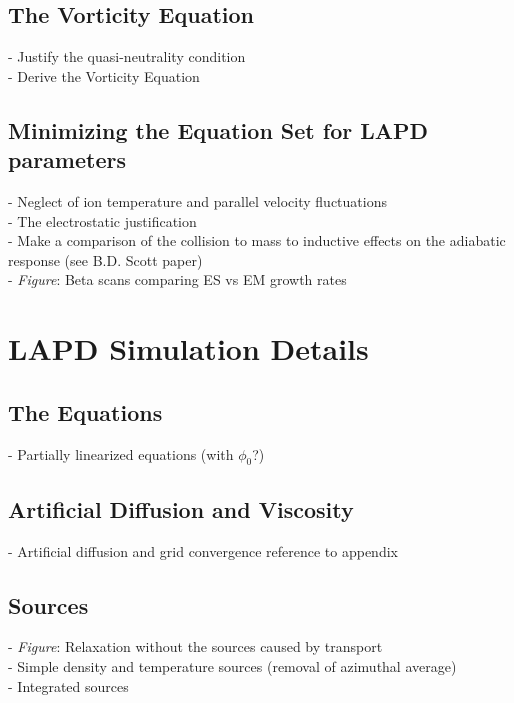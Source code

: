 \documentclass[12pt]{article}
\begin{document}
\subsection{The Vorticity Equation}

- Justify the quasi-neutrality condition \\
- Derive the Vorticity Equation \\

\subsection{Minimizing the Equation Set for LAPD parameters}

- Neglect of ion temperature and parallel velocity fluctuations \\
- The electrostatic justification \\
- Make a comparison of the collision to mass to inductive effects on the adiabatic response (see B.D. Scott paper) \\
- \emph{Figure}: Beta scans comparing ES vs EM growth rates \\


\section{LAPD Simulation Details}

\subsection{The Equations}

- Partially linearized equations (with $\phi_0$?) \\

\subsection{Artificial Diffusion and Viscosity}

- Artificial diffusion and grid convergence reference to appendix \\

\subsection{Sources}

- \emph{Figure}: Relaxation without the sources caused by transport \\
- Simple density and temperature sources (removal of azimuthal average) \\
- Integrated sources \\
\end{document}
